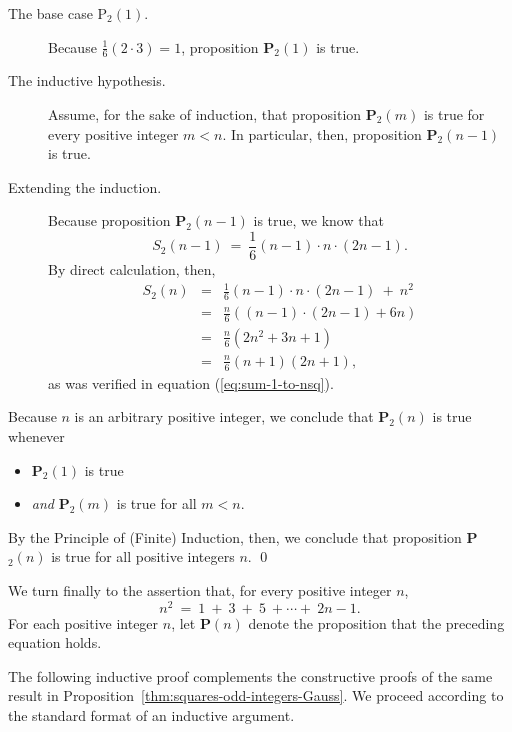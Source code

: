 \begin{description}
\item[{\small\sf The base case P$_2(1)$}.]
%
Because ${\displaystyle \frac{1}{6} (2 \cdot 3)} = 1$, proposition {\bf
    P}$_2(1)$ is true.

\item[{\small\sf The inductive hypothesis}.]
%
Assume, for the sake of induction, that proposition {\bf P}$_2(m)$ is
true for every positive integer $m < n$.  In particular, then,
proposition {\bf P}$_2(n-1)$ is true.

\item[{\small\sf Extending the induction}.]
%
Because proposition {\bf P}$_2(n-1)$ is true, we know that
\[ S_2(n-1) \ = \
\frac{1}{6} (n-1) \cdot n \cdot (2n-1).
\]
By direct calculation, then,
\begin{eqnarray*}
S_2(n) & = &
\frac{1}{6} (n-1) \cdot n \cdot (2n-1) \ + \ n^2 \\
  & = &
\frac{n}{6} \left( (n-1) \cdot (2n-1) + 6n \right) \\
  & = & \frac{n}{6} \left( 2n^2 +3n + 1 \right) \\ 
  & = & \frac{n}{6} (n+1)(2n+1),
\end{eqnarray*}
as was verified in equation (\ref{eq:sum-1-to-nsq}).
\end{description}
Because $n$ is an arbitrary positive integer, we conclude that
{\bf P}$_2(n)$ is true whenever
\begin{itemize}
\item
{\bf P}$_2(1)$ is true
\item
{\em and}
{\bf P}$_2(m)$ is true for all $m < n$.
\end{itemize}
By the Principle of (Finite) Induction, then, we conclude that
proposition {\bf P}$_2(n)$ is true for all positive integers $n$.
\qed


\bigskip

%
We turn finally to the assertion that, for every positive integer $n$,
\[ n^2 \ = \ 1 \ + \  3 \ + \ 5 \ + \cdots + \ 2n-1. \]
For each positive integer $n$, let {\bf P}$(n)$ denote the proposition
that the preceding equation holds.

The following inductive proof complements the constructive proofs of
the same result in Proposition~\ref{thm:squares-odd-integers-Gauss}.
We proceed according to the standard format of an inductive argument.


